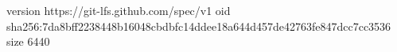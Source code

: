 version https://git-lfs.github.com/spec/v1
oid sha256:7da8bff2238448b16048cbdbfc14ddee18a644d457de42763fe847dcc7cc3536
size 6440
